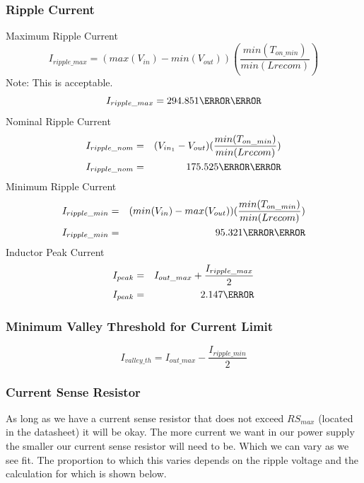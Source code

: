 \subsubsection{Ripple Current}
\begin{outline}[enumerate]
\1 Maximum Ripple Current
\begin{equation}
I_{ripple\_max}=(max(V_{in})-min(V_{out}))(\frac{min(T_{on\_min})}{min(L{recom})})
\end{equation}
\2 Note: This is acceptable.
\begin{equation}
I_{ripple\_max}=294.851\milli\ampere
\end{equation}
\1 Nominal Ripple Current
\begin{eqnarray}
I_{ripple\_nom}&=&(V_{in_1}-V_{out})(\frac{min(T_{on\_min})}{min(L{recom})})\\
I_{ripple\_nom}&=&175.525\milli\ampere
\end{eqnarray}
\1 Minimum Ripple Current
\begin{eqnarray}
I_{ripple\_min}&=&(min(V_{in})-max(V_{out}))(\frac{min(T_{on\_min})}{min(L{recom})})\\
I_{ripple\_min}&=&95.321\milli\ampere
\end{eqnarray}
\1 Inductor Peak Current
\begin{eqnarray}
I_{peak}&=&I_{out\_max}+\frac{I_{ripple\_max}}{2}\\
I_{peak}&=&2.147\ampere
\end{eqnarray}
\end{outline}

\subsubsection{Minimum Valley Threshold for Current Limit}
\begin{equation}
I_{valley\_th}=I_{out\_max}-\frac{I_{ripple\_min}}{2}
\end{equation}

\subsubsection{Current Sense Resistor}
As long as we have a current sense resistor that does not exceed $RS_{max}$ (located in the datasheet) it will be okay. The more current we want in our power supply the smaller our current sense resistor will need to be. Which we can vary as we see fit. The proportion to which this varies depends on the ripple voltage and the calculation for which is shown below.


